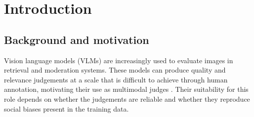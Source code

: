 \chapter{Introduction}\label{ch:intro}


\section{Background and motivation}\label{sec:intro-motivation}

Vision language models (VLMs) are increasingly used to evaluate images in
retrieval and moderation systems. These models can produce quality and
relevance judgements at a scale that is difficult to achieve through human
annotation, motivating their use as multimodal judges
\cite{chen2024mllmjudge,zheng2023judging}. Their suitability for this role
depends on whether the judgements are reliable and whether they reproduce
social biases present in the training data.

